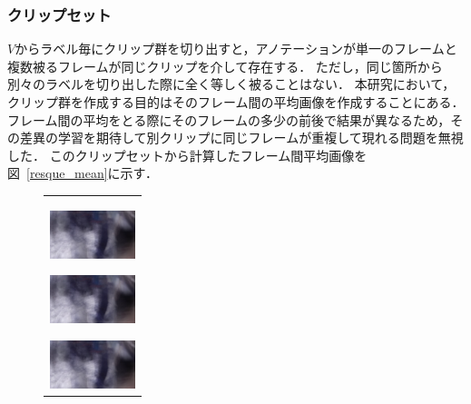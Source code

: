\subsubsection{クリップセット}
$V$からラベル毎にクリップ群を切り出すと，アノテーションが単一のフレームと複数被るフレームが同じクリップを介して存在する．
ただし，同じ箇所から別々のラベルを切り出した際に全く等しく被ることはない．
本研究において，クリップ群を作成する目的はそのフレーム間の平均画像を作成することにある．
フレーム間の平均をとる際にそのフレームの多少の前後で結果が異なるため，その差異の学習を期待して別クリップに同じフレームが重複して現れる問題を無視した．
このクリップセットから計算したフレーム間平均画像を図~\ref{resque_mean}に示す．


\begin{figure}[H]
  \begin{center}
    \begin{tabular}{c}
      \begin{minipage}{0.18\hsize}
        \begin{center}
          \includegraphics[clip, width=2.5cm]{./Figures/resque_mean1.eps}
          \hspace{0.3cm} { }
        \end{center}
      \end{minipage}
      \begin{minipage}{0.18\hsize}
        \begin{center}
          \includegraphics[clip, width=2.5cm]{./Figures/resque_mean1.eps}
          \hspace{0.3cm} { }
        \end{center}
      \end{minipage}
      \begin{minipage}{0.18\hsize}
        \begin{center}
          \includegraphics[clip, width=2.5cm]{./Figures/resque_mean1.eps}
          \hspace{2.0cm} {}

\end{center}
\end{minipage}
\end{tabular}
\end{center}
\end{figure}
